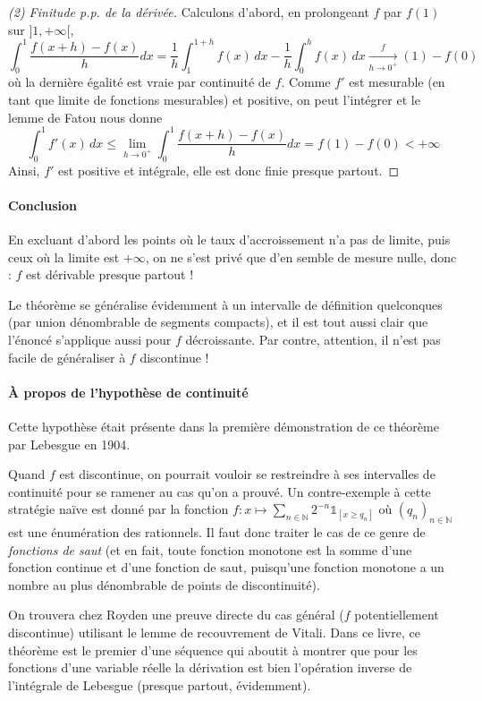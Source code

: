 \documentclass[a4paper, 11pt]{article}
\def\N{\mathbb{N}}
\def\Indic{\mathbb{1}}
\begin{document}
\begin{proof}[(2) Finitude p.p. de la dérivée]
Calculons d'abord, en prolongeant $f$ par $f(1)$ sur $]1,+\infty[$,
\[
  \int_0^1 \frac{f(x+h) - f(x)}{h}dx =
    \frac{1}{h} \int_1^{1+h} f(x)\,dx - \frac{1}{h} \int_0^h f(x)\,dx
    \xrightarrow[h \to 0^+] f(1) - f(0)
\]
où la dernière égalité est vraie par continuité de $f$. Comme $f'$ est mesurable
(en tant que limite de fonctions mesurables) et positive, on peut l'intégrer et
le lemme de Fatou nous donne
\[ \int_0^{1} f'(x)\,dx \leq \lim_{h \to 0^+}
  \int_0^{1} \frac{f(x+h) - f(x)}{h}dx =
  f(1)- f(0) < +\infty \]
Ainsi, $f'$ est positive et intégrale, elle est donc finie presque partout.
\end{proof}

\paragraph{Conclusion} En excluant d'abord les points où le taux d'accroissement
n'a pas de limite, puis ceux où la limite est $+\infty$, on ne s'est privé que
d'en semble de mesure nulle, donc : $f$ est dérivable presque partout !

Le théorème se généralise évidemment à un intervalle de définition quelconques
(par union dénombrable de segments compacts), et il est tout aussi clair que
l'énoncé s'applique aussi pour $f$ décroissante. Par contre, attention, il n'est
pas facile de généraliser à $f$ discontinue !

\paragraph{À propos de l'hypothèse de continuité} Cette hypothèse était présente
dans la première démonstration de ce théorème par Lebesgue en 1904.

Quand $f$ est discontinue, on pourrait vouloir se restreindre à ses intervalles
de continuité pour se ramener au cas qu'on a prouvé. Un contre-exemple à cette
stratégie naïve est donné par la fonction $f : x \mapsto \sum_{n \in \N} 2^{-n}
\Indic_{[x \geq q_n]}$ où $(q_n)_{n \in \N}$ est une énumération des rationnels.
Il faut donc traiter le cas de ce genre de \emph{fonctions de saut} (et en fait,
toute fonction monotone est la somme d'une fonction continue et d'une fonction
de saut, puisqu'une fonction monotone a un nombre au plus dénombrable de points
de discontinuité).

On trouvera chez Royden une preuve directe du cas général ($f$ potentiellement
discontinue) utilisant le lemme de recouvrement de Vitali. Dans ce livre, ce
théorème est le premier d'une séquence qui aboutit à montrer que pour les
fonctions d'une variable réelle la dérivation est bien l'opération inverse de
l'intégrale de Lebesgue (presque partout, évidemment).
\end{document}
